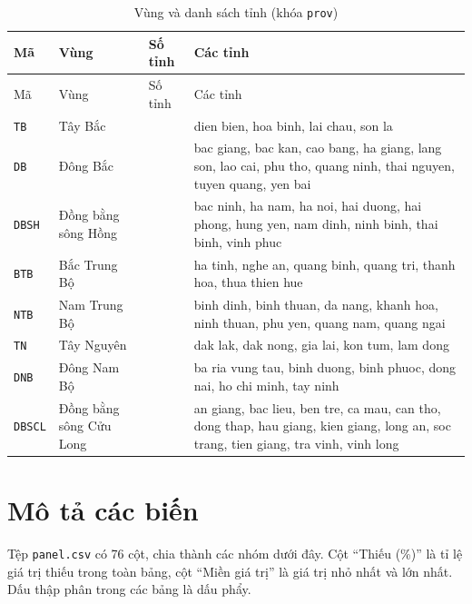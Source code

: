 \documentclass[12pt,a4paper]{article}
\begin{document}
\begingroup
\small
\begin{longtable}{@{}>{\raggedright\arraybackslash}p{1.2cm}>{\raggedright\arraybackslash}p{2.8cm}>{\raggedright\arraybackslash}p{1.0cm}>{\raggedright\arraybackslash}p{9.0cm}@{}}
\caption{Vùng và danh sách tỉnh (khóa \texttt{prov})}\label{tab:regions}\\
\toprule
Mã & Vùng & Số tỉnh & Các tỉnh \\
\midrule
\endfirsthead
\toprule
Mã & Vùng & Số tỉnh & Các tỉnh \\
\midrule
\endhead
\bottomrule
\endfoot
\texttt{TB} & Tây Bắc & 4 & dien bien, hoa binh, lai chau, son la \\
\texttt{DB} & Đông Bắc & 11 & bac giang, bac kan, cao bang, ha giang, lang son, lao cai, phu tho, quang ninh, thai nguyen, tuyen quang, yen bai \\
\texttt{DBSH} & Đồng bằng sông Hồng & 10 & bac ninh, ha nam, ha noi, hai duong, hai phong, hung yen, nam dinh, ninh binh, thai binh, vinh phuc \\
\texttt{BTB} & Bắc Trung Bộ & 6 & ha tinh, nghe an, quang binh, quang tri, thanh hoa, thua thien hue \\
\texttt{NTB} & Nam Trung Bộ & 8 & binh dinh, binh thuan, da nang, khanh hoa, ninh thuan, phu yen, quang nam, quang ngai \\
\texttt{TN} & Tây Nguyên & 5 & dak lak, dak nong, gia lai, kon tum, lam dong \\
\texttt{DNB} & Đông Nam Bộ & 6 & ba ria vung tau, binh duong, binh phuoc, dong nai, ho chi minh, tay ninh \\
\texttt{DBSCL} & Đồng bằng sông Cửu Long & 13 & an giang, bac lieu, ben tre, ca mau, can tho, dong thap, hau giang, kien giang, long an, soc trang, tien giang, tra vinh, vinh long \\
\end{longtable}
\endgroup


\section{Mô tả các biến}\label{sec:features}

Tệp \texttt{panel.csv} có 76 cột, chia thành các nhóm dưới đây. Cột ``Thiếu (\%)'' là tỉ lệ giá trị thiếu trong toàn bảng, cột ``Miền giá trị'' là giá trị nhỏ nhất và lớn nhất. Dấu thập phân trong các bảng là dấu phẩy.
\end{document}
